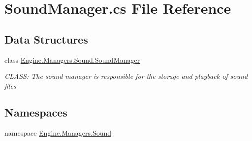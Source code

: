 \hypertarget{a00191}{}\section{Sound\+Manager.\+cs File Reference}
\label{a00191}
\subsection*{Data Structures}
\begin{DoxyCompactItemize}
\item 
class \hyperlink{a00546}{Engine.\+Managers.\+Sound.\+Sound\+Manager}
\begin{DoxyCompactList}\small\item\em C\+L\+A\+SS\+: The sound manager is responsible for the storage and playback of sound files \end{DoxyCompactList}\end{DoxyCompactItemize}
\subsection*{Namespaces}
\begin{DoxyCompactItemize}
\item 
namespace \hyperlink{a00275}{Engine.\+Managers.\+Sound}
\end{DoxyCompactItemize}
